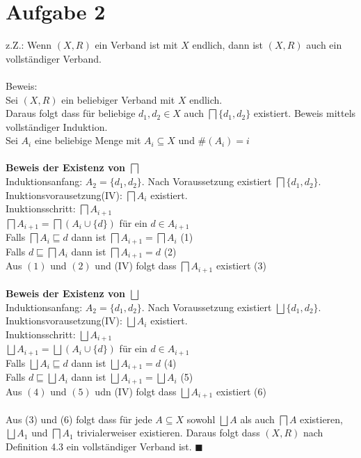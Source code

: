 \section*{Aufgabe 2}

z.Z.: Wenn $(X,R)$ ein Verband ist mit $X$ endlich, dann ist $(X,R)$ auch ein vollständiger Verband.\\\\
Beweis:\\
Sei $(X,R)$ ein beliebiger Verband mit $X$ endlich.\\
Daraus folgt dass für beliebige $d_1, d_2 \in X$ auch $\bigsqcap \{d_1,d_2\}$ existiert.
Beweis mittels vollständiger Induktion.\\
Sei $A_i$ eine beliebige Menge mit $A_i \subseteq X$ und $\#(A_i) = i$\\\\
\textbf{Beweis der Existenz von $\bigsqcap$}\\
Induktionsanfang: $A_2 = \{d_1,d_2\}$. Nach Voraussetzung existiert $\bigsqcap \{d_1,d_2\}$.\\
Inuktionsvorausetzung(IV): $\bigsqcap A_i$ existiert.\\
Inuktionsschritt: $\bigsqcap A_{i+1}$ \\
$\bigsqcap A_{i+1} = \bigsqcap(A_{i} \cup \{d\})$ für ein $d \in A_{i+1}$\\
Falls $\bigsqcap A_{i} \sqsubseteq d$ dann ist $\bigsqcap A_{i+1} = \bigsqcap A_{i}$ (1)\\
Falls $d \sqsubseteq \bigsqcap A_{i}$ dann ist $\bigsqcap A_{i+1} = d$ (2)\\
Aus $(1)$ und $(2)$ und (IV) folgt dass $\bigsqcap A_{i+1}$ existiert (3)\\\\
\textbf{Beweis der Existenz von $\bigsqcup$}\\
Induktionsanfang: $A_2 = \{d_1,d_2\}$. Nach Voraussetzung existiert $\bigsqcup \{d_1,d_2\}$.\\
Inuktionsvorausetzung(IV): $\bigsqcup A_i$ existiert.\\
Inuktionsschritt: $\bigsqcup A_{i+1}$ \\
$\bigsqcup A_{i+1} = \bigsqcup(A_{i} \cup \{d\})$ für ein $d \in A_{i+1}$\\
Falls $\bigsqcup A_{i} \sqsubseteq d$ dann ist $\bigsqcup A_{i+1} = d$ (4)\\
Falls $d \sqsubseteq \bigsqcup A_{i}$ dann ist $\bigsqcup A_{i+1} = \bigsqcup A_{i}$ (5)\\
Aus $(4)$ und $(5)$ udn (IV) folgt dass $\bigsqcup A_{i+1}$ existiert (6)\\\\
Aus (3) und (6) folgt dass für jede $A \subseteq X$ sowohl  $\bigsqcup A$ als auch $\bigsqcap A$ existieren, $\bigsqcup A_1$  und $\bigsqcap A_1$ trivialerweiser existieren. Daraus folgt dass $(X,R)$ nach Definition 4.3 ein vollständiger Verband ist. $\blacksquare$